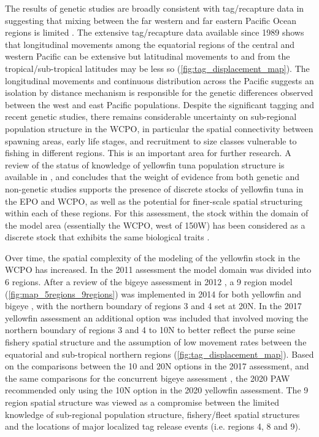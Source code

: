 The results of genetic studies are broadly consistent with tag/recapture data in suggesting that mixing between the far western and far eastern Pacific Ocean regions is limited \citep{moore_defining_2020,hamer_review_2023}. The extensive tag/recapture data available since 1989 shows that longitudinal movements among the equatorial regions of the central and western Pacific can be extensive but latitudinal movements to and from the tropical/sub-tropical latitudes may be less so (\cref{fig:tag_displacement_map}). The longitudinal movements and continuous distribution across the Pacific suggests an isolation by distance mechanism is responsible for the genetic differences observed between the west and east Pacific populations. Despite the significant tagging and recent genetic studies, there remains considerable uncertainty on sub-regional population structure in the WCPO, in particular the spatial connectivity between spawning areas, early life stages, and recruitment to size classes vulnerable to fishing in different regions. This is an important area for further research. A review of the status of knowledge of yellowfin tuna population structure is available in \citet{moore_defining_2020}, and concludes that the weight of evidence from both genetic and non-genetic studies supports the presence of discrete stocks of yellowfin tuna in the EPO and WCPO, as well as the potential for finer-scale spatial structuring within each of these regions. For this assessment, the stock within the domain of the model area (essentially the WCPO, west of 150\degree W) has been considered as a discrete stock that exhibits the same biological traits \citep{langley_stock_2011,davies_stock_2014,tremblay-boyer_stock_2017}.

Over time, the spatial complexity of the modeling of the yellowfin stock in the WCPO has increased. In the 2011 assessment the model domain was divided into 6 regions. After a review of the bigeye assessment in 2012 \citep{ianelli_independent_2012}, a 9 region model (\cref{fig:map_5regions_9regions}) was implemented in 2014 for both yellowfin and bigeye \citep{davies_stock_2014,harley_stock_2014,mckechnie_basis_2014}, with the northern boundary of regions 3 and 4 set at 20\degree N. In the 2017 yellowfin assessment \citep{tremblay-boyer_stock_2017} an additional option was included that involved moving the northern boundary of regions 3 and 4 to 10\degree N to better reflect the purse seine fishery spatial structure and the assumption of low movement rates between the equatorial and sub-tropical northern regions (\cref{fig:tag_displacement_map}). Based on the comparisons between the 10 and 20\degree N options in the 2017 assessment, and the same comparisons for the concurrent bigeye assessment \citep{vincent_incorporation_2018}, the 2020 PAW recommended only using the 10\degree N option in the 2020 yellowfin assessment. The 9 region spatial structure was viewed as a compromise between the limited knowledge of sub-regional population structure, fishery/fleet spatial structures and the locations of major localized tag release events (i.e. regions 4, 8 and 9).

